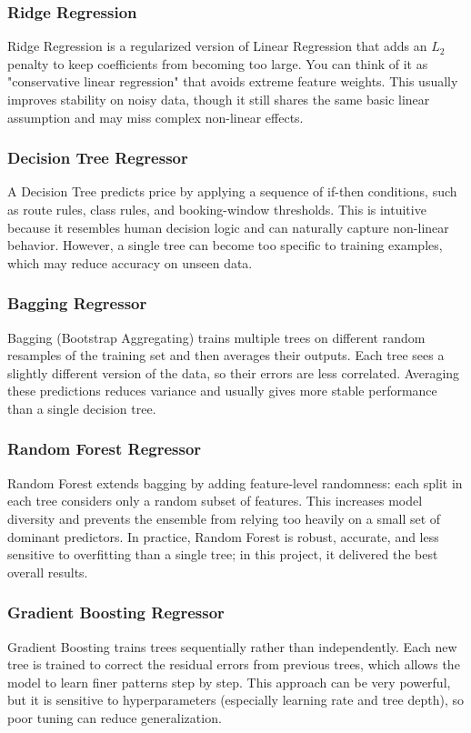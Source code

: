 \documentclass[conference]{IEEEtran}
\begin{document}
\subsubsection{Ridge Regression}
Ridge Regression is a regularized version of Linear Regression that adds an $L_2$ penalty to keep coefficients from becoming too large. You can think of it as "conservative linear regression" that avoids extreme feature weights. This usually improves stability on noisy data, though it still shares the same basic linear assumption and may miss complex non-linear effects.

\subsubsection{Decision Tree Regressor}
A Decision Tree predicts price by applying a sequence of if-then conditions, such as route rules, class rules, and booking-window thresholds. This is intuitive because it resembles human decision logic and can naturally capture non-linear behavior. However, a single tree can become too specific to training examples, which may reduce accuracy on unseen data.

\subsubsection{Bagging Regressor}
Bagging (Bootstrap Aggregating) trains multiple trees on different random resamples of the training set and then averages their outputs. Each tree sees a slightly different version of the data, so their errors are less correlated. Averaging these predictions reduces variance and usually gives more stable performance than a single decision tree.

\subsubsection{Random Forest Regressor}
Random Forest extends bagging by adding feature-level randomness: each split in each tree considers only a random subset of features. This increases model diversity and prevents the ensemble from relying too heavily on a small set of dominant predictors. In practice, Random Forest is robust, accurate, and less sensitive to overfitting than a single tree; in this project, it delivered the best overall results.

\subsubsection{Gradient Boosting Regressor}
Gradient Boosting trains trees sequentially rather than independently. Each new tree is trained to correct the residual errors from previous trees, which allows the model to learn finer patterns step by step. This approach can be very powerful, but it is sensitive to hyperparameters (especially learning rate and tree depth), so poor tuning can reduce generalization.
\end{document}
